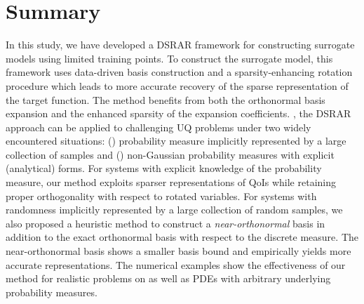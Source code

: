 \section{Summary}
\label{sec:summary}

In this study, we have developed a \ac{DSRAR} framework for constructing surrogate models  using limited training points. 
%
%
To construct the surrogate model, this framework uses data-driven 
 basis 
construction and a sparsity-enhancing rotation procedure which leads 
to more accurate recovery of the sparse representation of the target function. 
%
%
%
%
%
The method benefits from both the orthonormal 
basis expansion and the enhanced sparsity of the expansion coefficients. 
%
,
the \ac{DSRAR} approach can be applied to challenging \ac{UQ} problems 
under two widely encountered situations: () probability measure 
implicitly represented by a large collection of samples and () 
non-Gaussian probability measures with explicit (analytical) forms.
%
For systems with explicit knowledge of the probability measure, our 
method exploits sparser representations of \acp{QoI} while retaining 
proper orthogonality with respect to rotated variables.
%
For systems with randomness implicitly represented by a large collection 
of random samples, we also proposed a heuristic method to construct a 
\emph{near-orthonormal} basis in addition to the exact orthonormal basis 
with respect to the discrete measure. The near-orthonormal basis 
shows {\color{blue}a} smaller basis bound and empirically yields more accurate 
representations. 
%
The numerical examples show the 
effectiveness of our method for realistic problems on  as well 
as \acp{PDE} with arbitrary underlying probability measures.

